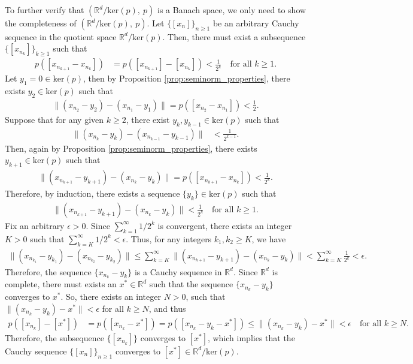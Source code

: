 \documentclass[11 pt]{article}
\begin{document}
	To further verify that $\left(\mathbb{R}^d/\text{ker}(p), ~p \right)$ is a Banach space, we only need to show the completeness of $\left(\mathbb{R}^d/\text{ker}(p), ~p \right)$. Let $\{[x_n]\}_{n \geq 1}$ be an arbitrary Cauchy sequence in the quotient space $\mathbb{R}^d/\text{ker}(p)$. Then, there must exist a subsequence $\{[x_{n_k}]\}_{k \geq 1}$ such that
	\begin{align*}
		p([x_{n_{k+1}} - x_{n_{k}}]) &= p([x_{n_{k+1}}] - [x_{n_{k}}]) < \frac{1}{2^k} \quad \text{for all } k \geq 1.
	\end{align*}
	Let $y_1 = 0 \in \text{ker}(p)$, then by Proposition \ref{prop:seminorm_properties}, there exists $y_2 \in \text{ker}(p)$ such that
	\begin{align*}
		\| (x_{n_2} - y_2) - (x_{n_1} - y_1) \| = p([x_{n_2} - x_{n_1}]) < \frac{1}{2}.
	\end{align*}
	Suppose that for any given $k \geq 2$, there exist $y_k, y_{k-1} \in \text{ker}(p)$ such that
	\begin{align*}
		\| (x_{n_k} - y_k) - (x_{n_{k-1}} - y_{k-1}) \| &< \frac{1}{2^{k-1}}.
	\end{align*}
	Then, again by Proposition \ref{prop:seminorm_properties}, there exists $y_{k+1} \in \text{ker}(p)$ such that
	\begin{align*}
		\| (x_{n_{k+1}} - y_{k+1}) - (x_{n_k} - y_k) \| = p([x_{n_{k+1}} - x_{n_{k}}]) < \frac{1}{2^k}.
	\end{align*}
	Therefore, by induction, there exists a sequence $\{y_k\} \in \text{ker}(p)$ such that
	\begin{align*}
		\| (x_{n_{k+1}} - y_{k+1}) - (x_{n_k} - y_k) \| < \frac{1}{2^{k}} \quad \text{for all } k \geq 1.
	\end{align*}
	Fix an arbitrary $\epsilon > 0$. Since $\sum^\infty_{k=1} 1/2^{k}$ is convergent, there exists an integer $K > 0$ such that $\sum^\infty_{k=K} 1/2^{k} < \epsilon$. Thus, for any integers $k_1, k_2 \geq K$, we have
	\begin{align*}
		\| (x_{n_{k_1}} - y_{k_1}) - (x_{n_{k_2}} - y_{k_2}) \| \leq \sum^\infty_{k=K} \| (x_{n_{k+1}} - y_{k+1}) - (x_{n_k} - y_k) \| < \sum^\infty_{k=K} \frac{1}{2^{k}} < \epsilon.
	\end{align*}
	Therefore, the sequence $\{x_{n_k} - y_k\}$ is a Cauchy sequence in $\mathbb{R}^d$. Since $\mathbb{R}^d$ is complete, there must exists an $x^* \in \mathbb{R}^d$ such that the sequence $\{x_{n_k} - y_k\}$ converges to $x^*$. So, there exists an integer $N > 0$, such that $\| (x_{n_k}-y_k) - x^*\| < \epsilon$ for all $k \geq N$, and thus
	\begin{align*}
		p([x_{n_k}] - [x^*]) &= p([x_{n_k} - x^*]) = p([x_{n_k} - y_k - x^*]) \leq \| (x_{n_k} - y_k) - x^* \| < \epsilon \quad \text{for all } k \geq N.
	\end{align*}
	Therefore, the subsequence $\{[x_{n_k}]\}$ converges to $[x^*]$, which implies that the Cauchy sequence $\{[x_n]\}_{n \geq 1}$ converges to $[x^*] \in \mathbb{R}^d/\text{ker}(p)$.
	
\end{document}
